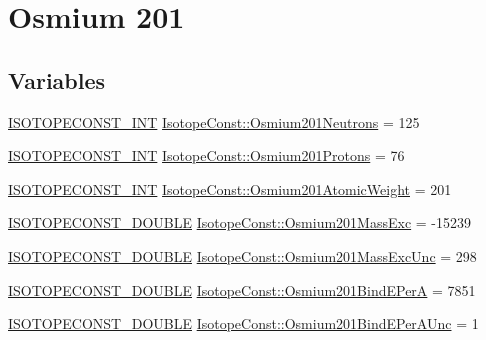 \hypertarget{group___isotope_const-_osmium-_os201}{}\section{Osmium 201}
\label{group___isotope_const-_osmium-_os201}
\subsection*{Variables}
\begin{DoxyCompactItemize}
\item 
\mbox{\hyperlink{group___isotope_const-_macros_ga5f18360b3e99483a35c32d789e62621c}{I\+S\+O\+T\+O\+P\+E\+C\+O\+N\+S\+T\+\_\+\+I\+NT}} \mbox{\hyperlink{group___isotope_const-_osmium-_os201_ga2fc2a5a00e4037e444aab4718b69eb31}{Isotope\+Const\+::\+Osmium201\+Neutrons}} = 125
\item 
\mbox{\hyperlink{group___isotope_const-_macros_ga5f18360b3e99483a35c32d789e62621c}{I\+S\+O\+T\+O\+P\+E\+C\+O\+N\+S\+T\+\_\+\+I\+NT}} \mbox{\hyperlink{group___isotope_const-_osmium-_os201_ga076e28745c03c485df09ec145bdfdafa}{Isotope\+Const\+::\+Osmium201\+Protons}} = 76
\item 
\mbox{\hyperlink{group___isotope_const-_macros_ga5f18360b3e99483a35c32d789e62621c}{I\+S\+O\+T\+O\+P\+E\+C\+O\+N\+S\+T\+\_\+\+I\+NT}} \mbox{\hyperlink{group___isotope_const-_osmium-_os201_ga82b01ea5a49a181cfa0cb20d802a91b1}{Isotope\+Const\+::\+Osmium201\+Atomic\+Weight}} = 201
\item 
\mbox{\hyperlink{group___isotope_const-_macros_ga8f45a7272ce02c0b4c65c44636ed719a}{I\+S\+O\+T\+O\+P\+E\+C\+O\+N\+S\+T\+\_\+\+D\+O\+U\+B\+LE}} \mbox{\hyperlink{group___isotope_const-_osmium-_os201_ga1e5020eb4b1acd701e75129f6b243d9f}{Isotope\+Const\+::\+Osmium201\+Mass\+Exc}} = -\/15239
\item 
\mbox{\hyperlink{group___isotope_const-_macros_ga8f45a7272ce02c0b4c65c44636ed719a}{I\+S\+O\+T\+O\+P\+E\+C\+O\+N\+S\+T\+\_\+\+D\+O\+U\+B\+LE}} \mbox{\hyperlink{group___isotope_const-_osmium-_os201_ga5156aaca3ad3194283d23959b201ab5a}{Isotope\+Const\+::\+Osmium201\+Mass\+Exc\+Unc}} = 298
\item 
\mbox{\hyperlink{group___isotope_const-_macros_ga8f45a7272ce02c0b4c65c44636ed719a}{I\+S\+O\+T\+O\+P\+E\+C\+O\+N\+S\+T\+\_\+\+D\+O\+U\+B\+LE}} \mbox{\hyperlink{group___isotope_const-_osmium-_os201_gaac74564380e384815654bdbc37686eeb}{Isotope\+Const\+::\+Osmium201\+Bind\+E\+PerA}} = 7851
\item 
\mbox{\hyperlink{group___isotope_const-_macros_ga8f45a7272ce02c0b4c65c44636ed719a}{I\+S\+O\+T\+O\+P\+E\+C\+O\+N\+S\+T\+\_\+\+D\+O\+U\+B\+LE}} \mbox{\hyperlink{group___isotope_const-_osmium-_os201_ga94a8e0ce7b8cb16c345c0cc533913c04}{Isotope\+Const\+::\+Osmium201\+Bind\+E\+Per\+A\+Unc}} = 1

\end{DoxyCompactItemize}
